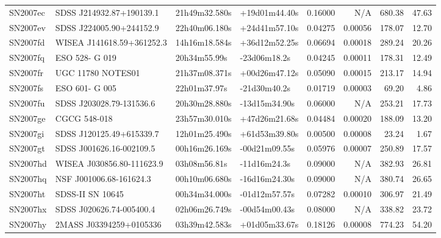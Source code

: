 \begin{longtable}{llllrrrr}
SN2007ec         &        SDSS J214932.87+190139.1 &   21h49m32.580s &   +19d01m44.40s &  0.16000 &      N/A &   680.38 &       47.63 \\
SN2007ev         &        SDSS J224005.90+244152.9 &   22h40m06.180s &   +24d41m57.10s &  0.04275 &  0.00056 &   178.07 &       12.70 \\
SN2007fd         &       WISEA J141618.59+361252.3 &   14h16m18.584s &   +36d12m52.25s &  0.06694 &  0.00018 &   289.24 &       20.26 \\
SN2007fq         &                  ESO 528- G 019 &    20h34m55.99s &    -23d06m18.2s &  0.04245 &  0.00011 &   178.31 &       12.49 \\
SN2007fr         &               UGC 11780 NOTES01 &   21h37m08.371s &   +00d26m47.12s &  0.05090 &  0.00015 &   213.17 &       14.94 \\
SN2007fs         &                  ESO 601- G 005 &    22h01m37.97s &    -21d30m40.2s &  0.01719 &  0.00003 &    69.20 &        4.86 \\
SN2007fu         &        SDSS J203028.79-131536.6 &   20h30m28.880s &   -13d15m34.90s &  0.06000 &      N/A &   253.21 &       17.73 \\
SN2007ge         &                    CGCG 548-018 &   23h57m30.010s &   +47d26m21.68s &  0.04484 &  0.00020 &   188.09 &       13.20 \\
SN2007gi         &        SDSS J120125.49+615339.7 &   12h01m25.490s &   +61d53m39.80s &  0.00500 &  0.00008 &    23.24 &        1.67 \\
SN2007gt         &        SDSS J001626.16-002109.5 &   00h16m26.169s &   -00d21m09.55s &  0.05976 &  0.00007 &   250.89 &       17.57 \\
SN2007hd         &       WISEA J030856.80-111623.9 &    03h08m56.81s &    -11d16m24.3s &  0.09000 &      N/A &   382.93 &       26.81 \\
SN2007hq         &         NSF J001006.68-161624.3 &   00h10m06.680s &   -16d16m24.30s &  0.09000 &      N/A &   380.74 &       26.65 \\
SN2007ht         &                SDSS-II SN 10645 &   00h34m34.000s &   -01d12m57.57s &  0.07282 &  0.00010 &   306.97 &       21.49 \\
SN2007hx         &        SDSS J020626.74-005400.4 &   02h06m26.749s &   -00d54m00.43s &  0.08000 &      N/A &   338.82 &       23.72 \\
SN2007hy         &         2MASS J03394259+0105336 &   03h39m42.583s &   +01d05m33.67s &  0.18126 &  0.00008 &   774.23 &       54.20 \\

\end{longtable}
